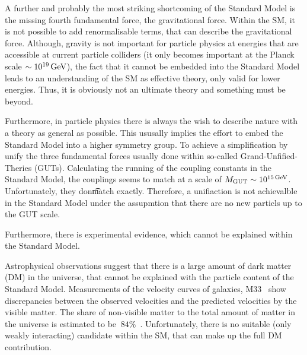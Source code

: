  


A further and probably the most striking shortcoming of the Standard Model is the missing fourth fundamental force, the gravitational force.
Within the SM, it is not possible to add renormalisable terms, that can describe the gravitational force.
Although, gravity is not important for particle physics at energies that are accessible at current particle colliders (it only becomes important at the Planck scale $\sim 10^{19}\,\text{Ge}\kern-0.06667em\text{V}$), the fact that it cannot be embedded into the Standard Model leads to an understanding of the SM as effective theory, only valid for lower energies.
Thus, it is obviously not an ultimate theory and something must be beyond.

Furthermore, in particle physics there is always the wish to describe nature with a theory as general as possible.
This ususally implies the effort to embed the Standard Model into a higher symmetry group.
To achieve a simplification by unify the three fundamental forces usually done within so-called Grand-Unfified-Theries (GUTs).
Calculating the running of the coupling constants in the Standard Model, the couplings seems to match at a scale of $M_{\text{GUT}} \sim 10^{15\,\text{Ge}\kern-0.06667em\text{V}}$.
Unfortunately, they don\t match exactly.
Therefore, a unifiaction is not achievalble in the Standard Model under the assupmtion that there are no new particls up to the GUT scale.


Furthermore, there is experimental evidence, which cannot be explained within the Standard Model.

Astrophysical observations suggest that there is a large amount of dark matter (DM) in the universe, that cannot be explained with the particle content of the Standard Model.
Measurements of the velocity curves of galaxies, \eg M33~\cite{bib:DM:RotationCurves} show discrepancies between the observed velocities and the predicted velocities by the visible matter.
The share of non-visible matter to the total amount of matter in the universe is estimated to be $~84\%$~\cite{bib:Planck_2015}.
Unfortunately, there is no suitable (only weakly interacting) candidate within the SM, that can make up the full DM contribution.\\



